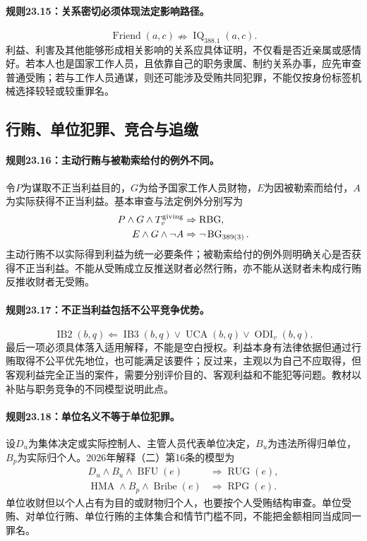 \paragraph{规则23.15：关系密切必须体现法定影响路径。}
\[
\operatorname{Friend}(a,c)\nRightarrow
\operatorname{IQ}_{388.1}(a,c).
\]
利益、利害及其他能够形成相关影响的关系应具体证明，不仅看是否近亲属或感情好。若本人也是国家工作人员，且依靠自己的职务隶属、制约关系办事，应先审查普通受贿；若与工作人员通谋，则还可能涉及受贿共同犯罪，不能仅按身份标签机械选择较轻或较重罪名。

\subsection{行贿、单位犯罪、竞合与追缴}
\paragraph{规则23.16：主动行贿与被勒索给付的例外不同。}
令$P$为谋取不正当利益目的，$G$为给予国家工作人员财物，$E$为因被勒索而给付，$A$为实际获得不正当利益。基本审查与法定例外分别写为
\[
\begin{aligned}
P\land G\land T^{\rm giving}_v&\Rightarrow\operatorname{RBG},\\
E\land G\land\neg A&\Rightarrow\neg\operatorname{BG}_{389(3)}.
\end{aligned}
\]
主动行贿不以实际得到利益为统一必要条件；被勒索给付的例外则明确关心是否获得不正当利益。不能从受贿成立反推送财者必然行贿，亦不能从送财者未构成行贿反推收财者无受贿。

\paragraph{规则23.17：不正当利益包括不公平竞争优势。}
\[
\operatorname{IB2}(b,q)
\Leftarrow\operatorname{IB3}(b,q)
\lor\operatorname{UCA}(b,q)
\lor\operatorname{ODI}_v(b,q).
\]
最后一项必须具体落入适用解释，不能是空白授权。利益本身有法律依据但通过行贿取得不公平优先地位，也可能满足该要件；反过来，主观以为自己不应取得，但客观利益完全正当的案件，需要分别评价目的、客观利益和不能犯等问题。教材以补贴与职务竞争的不同模型说明此点。

\paragraph{规则23.18：单位名义不等于单位犯罪。}
设$D_u$为集体决定或实际控制人、主管人员代表单位决定，$B_u$为违法所得归单位，$B_p$为实际归个人。2026年解释（二）第16条的模型为
\[
\begin{aligned}
D_u\land B_u\land\operatorname{BFU}(e)
&\Rightarrow\operatorname{RUG}(e),\\
\operatorname{HMA}\land B_p\land\operatorname{Bribe}(e)
&\Rightarrow\operatorname{RPG}(e).
\end{aligned}
\]
单位收财但以个人占有为目的或财物归个人，也要按个人受贿结构审查。单位受贿、对单位行贿、单位行贿的主体集合和情节门槛不同，不能把金额相同当成同一罪名。

